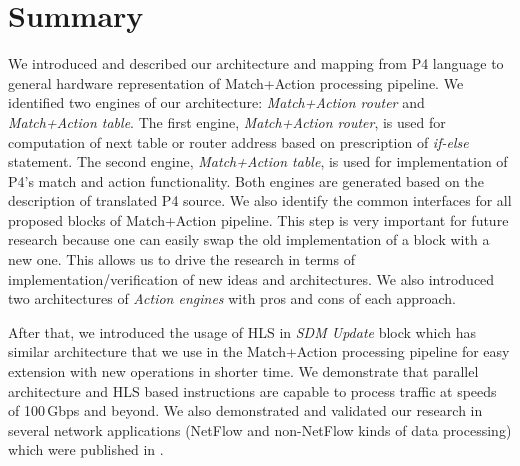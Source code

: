 \section{Summary}
We introduced and described our architecture and mapping from P4 language to general hardware representation 
of Match+Action processing pipeline. We identified two engines of our architecture: \emph{Match+Action router} and 
\emph{Match+Action table}.
The first engine, \emph{Match+Action router}, is used for computation of next table or router address based on 
prescription of \textit{if-else} statement. 
The second engine, \emph{Match+Action table}, is used for implementation of P4's match and action functionality. 
Both engines are generated based on the description of translated P4 source. 
We also identify the common interfaces for all proposed blocks of Match+Action pipeline.
This step is very important for future research because one can easily swap the old implementation of a block with a new one.
This allows us to drive the research in terms of implementation/verification of new ideas and architectures. 
We also introduced two architectures of \textit{Action engines} with pros and cons of each approach.

After that, we introduced the usage of HLS in \textit{SDM Update} block which has similar architecture that we use in the Match+Action 
processing pipeline for easy extension with new operations in shorter time. We demonstrate that parallel architecture and HLS based 
instructions are capable to process traffic at speeds of 100\,Gbps and beyond. 
We also demonstrated and validated our research in several network applications 
(NetFlow and non-NetFlow kinds of data processing) which were published in 
\cite{2014hls-instructions,2014sdmcpd-monterey,2014sdmmemincs,kekely2014trade}.
